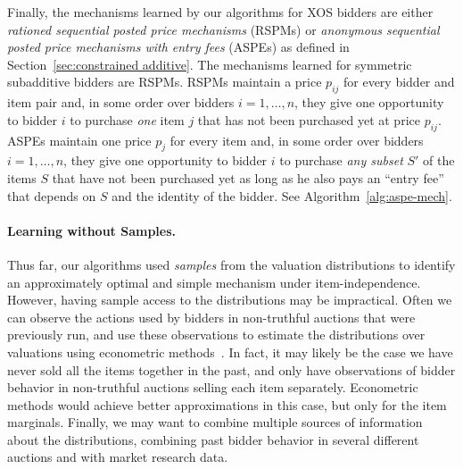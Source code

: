 Finally, the mechanisms learned by our algorithms for XOS bidders are either {\em rationed sequential posted price mechanisms} (RSPMs) or {\em anonymous sequential posted price mechanisms with entry fees} (ASPEs) as defined in Section~\ref{sec:constrained additive}. The mechanisms learned for symmetric subadditive bidders are RSPMs. RSPMs maintain a price $p_{ij}$ for every bidder and item pair and, in some order over bidders $i=1,\ldots,n$, they give one opportunity to bidder $i$ to purchase {\em one} item $j$ that has not been purchased yet at price $p_{ij}$. ASPEs maintain one price $p_j$ for every item and, in some order over bidders $i=1,\ldots,n$, they give one opportunity to bidder $i$ to purchase {\em any subset} $S'$ of the items $S$ that have not been purchased yet as long as he also pays an ``entry fee'' that depends on $S$ and the identity of the bidder. See Algorithm~\ref{alg:aspe-mech}. 

\vspace{-10pt}\paragraph{Learning without Samples.} Thus far, our algorithms used {\em samples} from the valuation distributions to identify an approximately optimal and simple mechanism under item-independence. However, having sample access to the distributions may be impractical. Often we can observe the actions used by bidders in non-truthful auctions that were previously run, and use these observations to estimate the distributions over valuations using econometric methods~\cite{GuerrePV00,PaarschH06,AtheyH2007nonparametric}. In fact, it may likely be the case we have never sold all the items together in the past, and only have observations of bidder behavior in non-truthful auctions selling each item separately. Econometric methods would achieve better approximations in this case, but only for the item marginals. Finally, we may want to combine multiple sources of information about the distributions, combining past bidder behavior in several different auctions and with market research data. 

